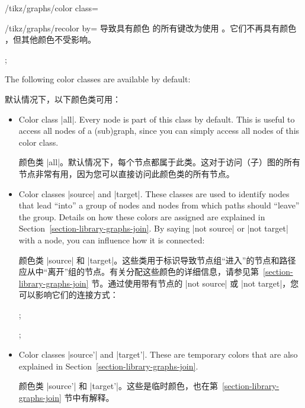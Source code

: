 \begin{key}{/tikz/graphs/color class=}
\begin{key}{/tikz/graphs/recolor  by=}
        导致具有颜色  的所有键改为使用 。它们不再具有颜色 ，但其他颜色不受影响。
\begin{codeexample}[preamble={\usetikzlibrary{graphs}}]
\tikz {};
\end{codeexample}
    \end{key}
\end{key}

The following color classes are available by default:

默认情况下，以下颜色类可用：

\begin{itemize}
\item Color class |all|. Every node is part of this class by default. This
is useful to access all nodes of a (sub)graph, since you can simply
access all nodes of this color class.

颜色类 |all|。默认情况下，每个节点都属于此类。这对于访问（子）图的所有节点非常有用，因为您可以直接访问此颜色类的所有节点。

\item Color classes |source| and |target|. These classes are used to
identify nodes that lead ``into'' a group of nodes and nodes from which
paths should ``leave'' the group. Details on how these colors are
assigned are explained in Section~\ref{section-library-graphs-join}. By
saying |not source| or |not target| with a node, you can influence how
it is connected:

颜色类 |source| 和 |target|。这些类用于标识导致节点组“进入”的节点和路径应从中“离开”组的节点。有关分配这些颜色的详细信息，请参见第~\ref{section-library-graphs-join} 节。通过使用带有节点的 |not source| 或 |not target|，您可以影响它们的连接方式：


\begin{codeexample}[preamble={\usetikzlibrary{graphs}}]
\tikz {};
\end{codeexample}
\begin{codeexample}[preamble={\usetikzlibrary{graphs}}]
\tikz {};
\end{codeexample}
    \item Color classes |source'| and |target'|. These are temporary colors
        that are also explained in Section~\ref{section-library-graphs-join}.

颜色类 |source'| 和 |target'|。这些是临时颜色，也在第~\ref{section-library-graphs-join} 节中有解释。
\end{itemize}


